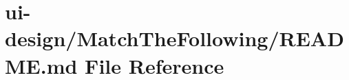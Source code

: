 \hypertarget{MatchTheFollowing_2README_8md}{}\section{ui-\/design/\+Match\+The\+Following/\+R\+E\+A\+D\+ME.md File Reference}
\label{MatchTheFollowing_2README_8md}
